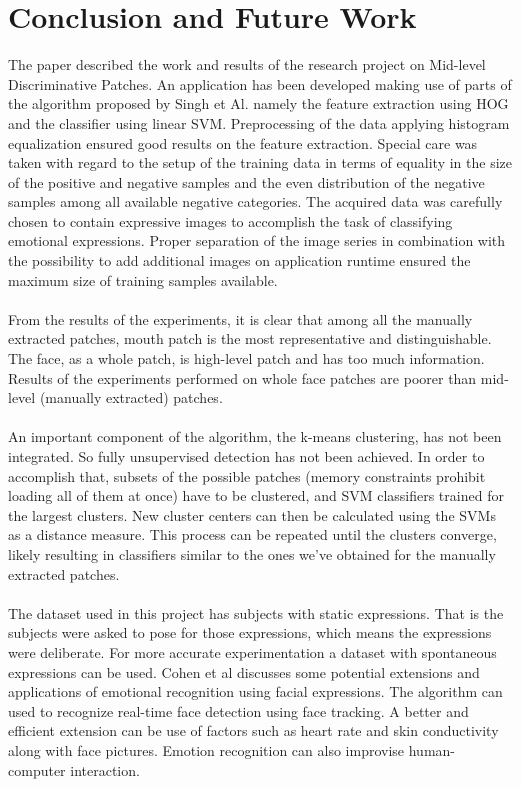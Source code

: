 \section{Conclusion and Future Work}

The paper described the work and results of the research project on Mid-level Discriminative Patches. An application has been developed making use of parts of the algorithm proposed by Singh et Al. \cite{Singh2012DiscPat} namely the feature extraction using HOG and the classifier using linear SVM. Preprocessing of the data applying histogram equalization ensured good results on the feature extraction. Special care was taken with regard to the setup of the training data in terms of equality in the size of the positive and negative samples and the even distribution of the negative samples among all available negative categories. The acquired data was carefully chosen to contain expressive images to accomplish the task of classifying emotional expressions. Proper separation of the image series in combination with the possibility to add additional images on application runtime ensured the maximum size of training samples available.
\\
\\
From the results of the experiments, it is clear that among all the manually extracted patches, mouth patch is the most representative and distinguishable. The face, as a whole patch, is high-level patch and has too much information. Results of the experiments performed on whole face patches are poorer than mid-level (manually extracted) patches. 
\\
\\
An important component of the algorithm, the k-means clustering, has not been integrated. So fully unsupervised detection has not been achieved. In order to accomplish that, subsets  of the possible patches (memory constraints prohibit loading all of them at once) have to be clustered, and SVM classifiers trained for the largest clusters. New cluster centers can then be calculated using the SVMs as a distance measure. This process can be repeated until the clusters converge, likely resulting in classifiers similar to the ones we've obtained for the manually extracted patches.
\\
\\
The dataset used in this project has subjects with static expressions. That is the subjects were asked to pose for those expressions, which means the expressions were deliberate. For more accurate experimentation a dataset with spontaneous expressions can be used. Cohen et al \cite{cohen2000emotion} discusses some potential extensions and applications of emotional recognition using facial expressions. The algorithm can used to recognize real-time face detection using face tracking. A better and efficient extension can be use of factors such as heart rate and skin conductivity along with face pictures. Emotion recognition can also improvise human-computer interaction. 

